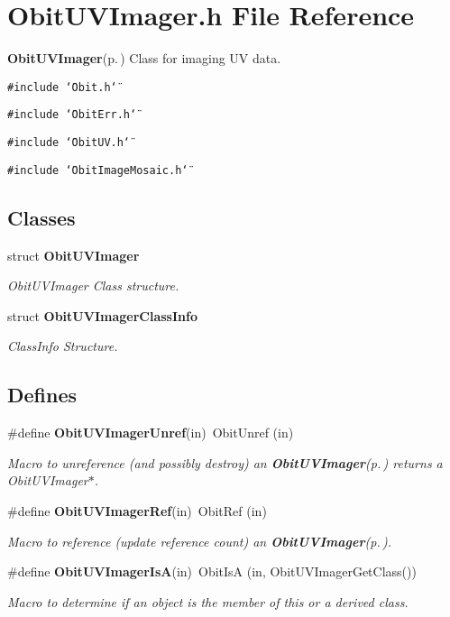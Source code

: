 \section{Obit\-UVImager.h File Reference}
\label{ObitUVImager_8h}
{\bf Obit\-UVImager}{\rm (p.\,\pageref{structObitUVImager})} Class for imaging UV data. 

{\tt \#include \char`\"{}Obit.h\char`\"{}}\par
{\tt \#include \char`\"{}Obit\-Err.h\char`\"{}}\par
{\tt \#include \char`\"{}Obit\-UV.h\char`\"{}}\par
{\tt \#include \char`\"{}Obit\-Image\-Mosaic.h\char`\"{}}\par
\subsection*{Classes}
\begin{CompactItemize}
\item 
struct {\bf Obit\-UVImager}
\begin{CompactList}\small\item\em Obit\-UVImager Class structure. \item\end{CompactList}\item 
struct {\bf Obit\-UVImager\-Class\-Info}
\begin{CompactList}\small\item\em Class\-Info Structure. \item\end{CompactList}\end{CompactItemize}
\subsection*{Defines}
\begin{CompactItemize}
\item 
\#define {\bf Obit\-UVImager\-Unref}(in)\ Obit\-Unref (in)
\begin{CompactList}\small\item\em Macro to unreference (and possibly destroy) an {\bf Obit\-UVImager}{\rm (p.\,\pageref{structObitUVImager})} returns a Obit\-UVImager$\ast$. \item\end{CompactList}\item 
\#define {\bf Obit\-UVImager\-Ref}(in)\ Obit\-Ref (in)
\begin{CompactList}\small\item\em Macro to reference (update reference count) an {\bf Obit\-UVImager}{\rm (p.\,\pageref{structObitUVImager})}. \item\end{CompactList}\item 
\#define {\bf Obit\-UVImager\-Is\-A}(in)\ Obit\-Is\-A (in, Obit\-UVImager\-Get\-Class())
\begin{CompactList}\small\item\em Macro to determine if an object is the member of this or a derived class. \item\end{CompactList}\end{CompactItemize}
